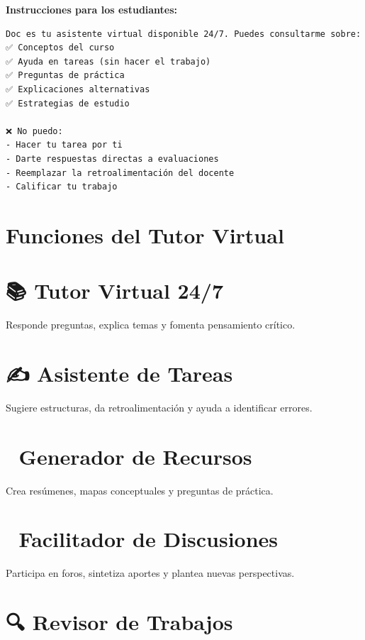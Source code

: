 \documentclass[
  spanish,
  12pt,
  letterpaper,
  DIV=11,
  numbers=noendperiod]{scrreprt}
\begin{document}
\textbf{Instrucciones para los estudiantes:}

\begin{verbatim}
Doc es tu asistente virtual disponible 24/7. Puedes consultarme sobre:
✅ Conceptos del curso
✅ Ayuda en tareas (sin hacer el trabajo)
✅ Preguntas de práctica
✅ Explicaciones alternativas
✅ Estrategias de estudio

❌ No puedo:
- Hacer tu tarea por ti
- Darte respuestas directas a evaluaciones
- Reemplazar la retroalimentación del docente
- Calificar tu trabajo
\end{verbatim}

\section{Funciones del Tutor Virtual}\label{funciones-del-tutor-virtual}

\section{📚 Tutor Virtual 24/7}\label{tutor-virtual-247}

Responde preguntas, explica temas y fomenta pensamiento crítico.

\section{✍️ Asistente de Tareas}\label{asistente-de-tareas}

Sugiere estructuras, da retroalimentación y ayuda a identificar errores.

\section{📖 Generador de Recursos}\label{generador-de-recursos}

Crea resúmenes, mapas conceptuales y preguntas de práctica.

\section{💬 Facilitador de
Discusiones}\label{facilitador-de-discusiones}

Participa en foros, sintetiza aportes y plantea nuevas perspectivas.

\section{🔍 Revisor de Trabajos}\label{revisor-de-trabajos}
\end{document}
